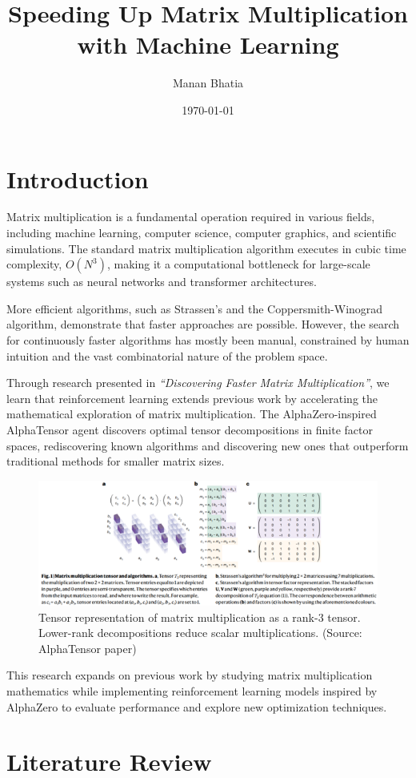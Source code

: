 \documentclass{article}
\title{Speeding Up Matrix Multiplication with Machine Learning}
\author{Manan Bhatia}
\date{\today}
\begin{document}
\maketitle

\section{Introduction}
Matrix multiplication is a fundamental operation required in various fields, including machine learning, computer science, computer graphics, and scientific simulations. The standard matrix multiplication algorithm executes in cubic time complexity, \( O(N^3) \), making it a computational bottleneck for large-scale systems such as neural networks and transformer architectures.

More efficient algorithms, such as Strassen’s and the Coppersmith-Winograd algorithm, demonstrate that faster approaches are possible. However, the search for continuously faster algorithms has mostly been manual, constrained by human intuition and the vast combinatorial nature of the problem space. 

Through research presented in \textit{“Discovering Faster Matrix Multiplication”}, we learn that reinforcement learning extends previous work by accelerating the mathematical exploration of matrix multiplication. The AlphaZero-inspired AlphaTensor agent discovers optimal tensor decompositions in finite factor spaces, rediscovering known algorithms and discovering new ones that outperform traditional methods for smaller matrix sizes.

\begin{figure}[h]
    \centering
    \includegraphics[width=0.8\linewidth]{Picture1.png}
    \caption{Tensor representation of matrix multiplication as a rank-3 tensor. Lower-rank decompositions reduce scalar multiplications. (Source: AlphaTensor paper)}
    \label{fig:tensor-representation}
\end{figure}

This research expands on previous work by studying matrix multiplication mathematics while implementing reinforcement learning models inspired by AlphaZero to evaluate performance and explore new optimization techniques.

\section{Literature Review}
\end{document}
